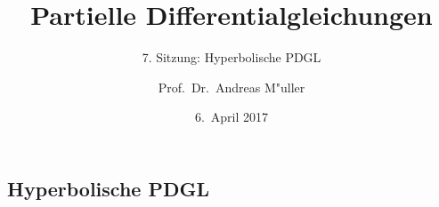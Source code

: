 \documentclass[handout]{beamer}
\title[]{Partielle Differentialgleichungen}
\subtitle{7. Sitzung: Hyperbolische PDGL}
\date[6.~April 2017]{6.~April 2017}
\author{Prof.~Dr.~Andreas M"uller}
\begin{document}
\begin{frame}
\section{Hyperbolische PDGL}
\titlepage

\end{frame}


\end{document}
